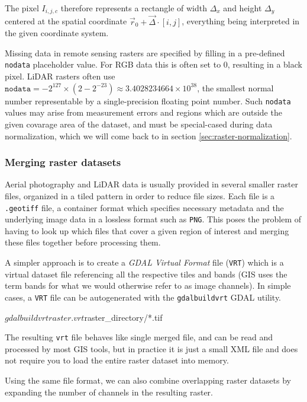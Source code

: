 The pixel $I_{i, j, c}$ therefore represents a rectangle of width $\Delta_x$ and height $\Delta_y$ centered at the spatial coordinate $\vec{r}_0 + \vec{\Delta} \cdot [i, j]$, everything being interpreted in the given coordinate system.

Missing data in remote sensing rasters are specified by filling in a pre-defined \texttt{nodata} placeholder value.
For RGB data this is often set to $0$, resulting in a black pixel.
LiDAR rasters often use $\texttt{nodata} = -2^{127} \times (2 - 2^{-23}) \approx 3.4028234664 \times 10^{38}$, the smallest normal number representable by a single-precision floating point number.
Such \texttt{nodata} values may arise from measurement errors and regions which are outside the given covarage area of the dataset, and must be special-cased during data normalization, which we will come back to in section \ref{sec:raster-normalization}.

\subsubsection*{Merging raster datasets}

Aerial photography and LiDAR data is usually provided in several smaller raster files, organized in a tiled pattern in order to reduce file sizes.
Each file is a \texttt{.geotiff} file, a container format which specifies necessary metadata and the underlying image data in a lossless format such as \texttt{PNG}.
This poses the problem of having to look up which files that cover a given region of interest and merging these files together before processing them.

A simpler approach is to create a \textit{GDAL Virtual Format} file (\texttt{VRT}) which is a virtual dataset file referencing all the respective tiles and bands (GIS uses the term bands for what we would otherwise refer to as image channels).
In simple cases, a \texttt{VRT} file can be autogenerated with the \texttt{gdalbuildvrt} GDAL utility.

\begin{shellcode}
$ gdalbuildvrt raster.vrt ${raster_directory}/*.tif
\end{shellcode}
%
The resulting \texttt{vrt} file behaves like single merged file, and can be read and processed by most GIS tools, but in practice it is just a small XML file and does not require you to load the entire raster dataset into memory.

Using the same file format, we can also combine overlapping raster datasets by expanding the number of channels in the resulting raster.

